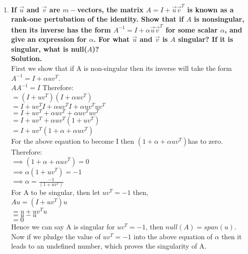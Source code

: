 \documentclass[12pt, oneside]{article}   	%
\begin{document}
\begin{enumerate}
	\item \textbf{  If $\vec{u}$ and $\vec{v}$ are $m-$vectors, the matrix $A = I+\vec{u}\vec{v}^T$ is known as a rank-one
		pertubation of the identity.  Show that if $A$ is nonsingular, then its inverse has the form $A^{-1} = I + \alpha
		\vec{u} \vec{v}^T$ for some scalar $\alpha$, and give an expression for $\alpha$.  For what $\vec{u}$ and $\vec{v}$ is
		$A$ singular?  If it is singular, what is null($A$)?}\\
	
	\textbf{Solution.}\\
	
	First we show that if A is non-singular then its inverse will take the form $A^{-1}= I + \alpha uv^T$.\\
	$AA^{-1} =I$   
	Therefore:\\

	\hspace{2cm}	$=(I+uv^T)(I+\alpha uv^T) $\\
	
	\hspace{2cm}$=I+uv^TI+\alpha uv^TI+ \alpha uv^T uv^T$\\
	
	\hspace{2cm} $= I +uv^T +\alpha uv^T+ \alpha uv^T uv^T$\\
	
	\hspace{2cm} $= I +uv^T +\alpha uv^T(1+uv^T)$\\
	
	\hspace{2cm} $= I +uv^T(1+\alpha +\alpha uv^T)$\\
	
	For the above eqaution to become I then $(1+\alpha +\alpha uv^T)$has to zero.
	Therefore: \\
	
	\hspace{2cm}$\implies(1+\alpha +\alpha uv^T)=0$\\
	
	\hspace{2cm}$\implies \alpha(1+ uv^T)=-1$\\
	
	\hspace{2cm}$\implies \alpha=\frac{-1}{(1+ uv^T)}$\\
	
	For A to be singular, then let $uv^T=-1$ then,\\
	$Au=(I+uv^T)u$\\
	$=u+uv^Tu$\\
	$=u-u$\\
	$=0$\\
	Hence we can say A is singular for $uv^T=-1$, then $null(A)=span(u)$. Now if we pludge the value of $uv^T=-1$ into the above equation of $\alpha$ then it leads to an undefined number, which proves the singularity of A.\\


\end{enumerate}
\end{document}
